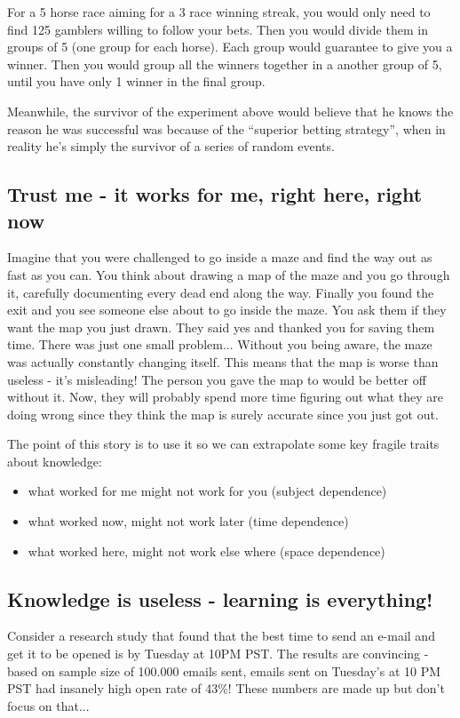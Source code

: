 \documentclass{article}
\begin{document}
For a 5 horse race aiming for a 3 race winning streak, you would only need to find 125 gamblers willing to follow your bets. Then you would divide them in groups of 5 (one group for each horse). Each group would guarantee to give you a winner. Then you would group all the winners together in a another group of 5, until you have only 1 winner in the final group.

Meanwhile, the survivor of the experiment above would believe that he knows the reason he was successful was because of the ``superior betting strategy'', when in reality he's simply the survivor of a series of random events.

\subsection{Trust me - it works for me, right here, right now}

Imagine that you were challenged to go inside a maze and find the way out as fast as you can. You think about drawing a map of the maze and you go through it, carefully documenting every dead end along the way. Finally you found the exit and you see someone else about to go inside the maze. You ask them if they want the map you just drawn. They said yes and thanked you for saving them time. There was just one small problem... Without you being aware, the maze was actually constantly changing itself. This means that the map is worse than useless - it's misleading! The person you gave the map to would be better off without it. Now, they will probably spend more time figuring out what they are doing wrong since they think the map is surely accurate since you just got out.

The point of this story is to use it so we can extrapolate some key fragile traits about knowledge: 
\begin{itemize}
	\item what worked for me might not work for you (subject dependence)
	\item  what worked now, might not work later (time dependence)
	\item  what worked here, might not work else where (space dependence)
\end{itemize}

\subsection{Knowledge is useless - learning is everything!}

Consider a research study that found that the best time to send an e-mail and get it to be opened is by Tuesday at 10PM PST. The results are convincing - based on sample size of 100.000 emails sent, emails sent on Tuesday's at 10 PM PST had insanely high open rate of 43\%! These numbers are made up but don't focus on that...
\end{document}
